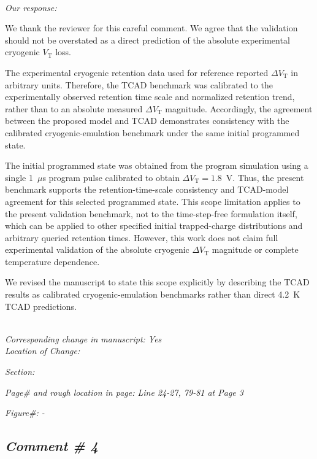 \documentclass[11pt]{article}
\begin{document}
\noindent \textit{\\Our response: }

We thank the reviewer for this careful comment.
We agree that the validation should not be overstated as a direct prediction of the absolute experimental cryogenic $V_\mathrm{T}$ loss.

The experimental cryogenic retention data used for reference reported $\Delta V_\mathrm{T}$ in arbitrary units.
Therefore, the TCAD benchmark was calibrated to the experimentally observed retention time scale and normalized retention trend, rather than to an absolute measured $\Delta V_\mathrm{T}$ magnitude.
Accordingly, the agreement between the proposed model and TCAD demonstrates consistency with the calibrated cryogenic-emulation benchmark under the same initial programmed state.

The initial programmed state was obtained from the program simulation using a single 1~$\mu$s program pulse calibrated to obtain $\Delta V_\mathrm{T}=1.8$~V.
Thus, the present benchmark supports the retention-time-scale consistency and TCAD-model agreement for this selected programmed state.
This scope limitation applies to the present validation benchmark, not to the time-step-free formulation itself, which can be applied to other specified initial trapped-charge distributions and arbitrary queried retention times.
However, this work does not claim full experimental validation of the absolute cryogenic $\Delta V_\mathrm{T}$ magnitude or complete temperature dependence.

We revised the manuscript to state this scope explicitly by describing the TCAD results as calibrated cryogenic-emulation benchmarks rather than direct 4.2~K TCAD predictions.

\noindent \textit{\\Corresponding change in manuscript: Yes \\Location of Change:}

\hspace{40pt} \noindent \textit{Section: \uppercase\expandafter{}}

\hspace{40pt} \noindent \textit{Page\# and rough location in page: Line 24-27, 79-81 at Page 3}

\hspace{40pt} \noindent \textit{Figure\#: - }


\subsection*{\textit{Comment \# 4}}
\end{document}

